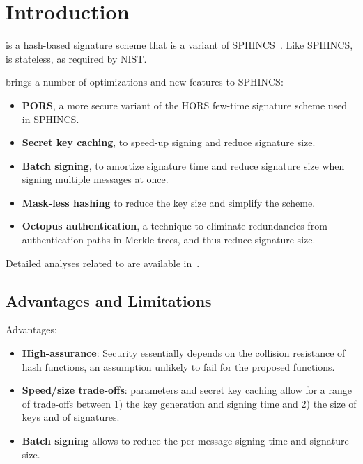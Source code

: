 \chapter{Introduction}\label{chap:introduction}

\gravity is a hash-based signature scheme that is a variant of SPHINCS~\cite{sphincs}. Like SPHINCS, \gravity is stateless, as required by NIST.

\gravity brings a number of optimizations and new features to SPHINCS:
\begin{itemize}
    \item \textbf{PORS}, a more secure variant of the HORS few-time signature scheme used in SPHINCS.
    \item \textbf{Secret key caching}, to speed-up signing and reduce signature size.
    \item \textbf{Batch signing}, to amortize signature time and reduce signature size when signing multiple messages at once.
    \item \textbf{Mask-less hashing} to reduce the key size and simplify the scheme.
    \item \textbf{Octopus authentication}, a technique to eliminate redundancies from authentication paths in Merkle trees, and thus reduce signature size.
\end{itemize}

Detailed analyses related to \gravity are available in~\cite{subsetres,ctrsapaper,masters}.

\section{Advantages and Limitations}

Advantages:
\begin{itemize}

\item \textbf{High-assurance}: Security essentially depends on the collision resistance of hash functions, an assumption unlikely to fail for the proposed functions. 

\item \textbf{Speed/size trade-offs}: \gravity parameters and secret key caching allow for a range of trade-offs between 1) the key generation and signing time and 2) the size of keys and of signatures.

\item \textbf{Batch signing} allows to reduce the per-message signing time and signature size.

\end{itemize}

